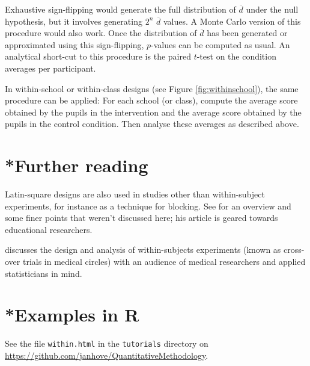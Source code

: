 Exhaustive sign-flipping would generate the full distribution of $\overline d$
under the null hypothesis, but it involves generating $2^n$ $\overline d$ values.
A Monte Carlo version of this procedure would also work.
Once the distribution of $\overline d$ has been generated or approximated using this sign-flipping,
$p$-values can be computed as usual.
An analytical short-cut to this procedure is the paired $t$-test on the condition averages per participant.
  
  In within-school or within-class designs (see Figure \vref{fig:withinschool}),
  the same procedure can be applied: For each school (or class), compute
  the average score obtained by the pupils in the intervention and the average
  score obtained by the pupils in the control condition.
  Then analyse these averages as described above.
\parend

\section{*Further reading}
Latin-square designs are also used in studies other than 
within-subject experiments, for instance as a technique for blocking.
See \citet{Richardson2018} for an overview and some finer points that weren't discussed here; 
his article is geared towards educational researchers.

\citet{Senn2002} discusses the design and analysis of within-subjects experiments
(known as cross-over trials in medical circles)
with an audience of medical researchers and applied statisticians in mind.

\section{*Examples in R}
See the file \texttt{within.html} in the \texttt{tutorials} directory
on \url{https://github.com/janhove/QuantitativeMethodology}.
